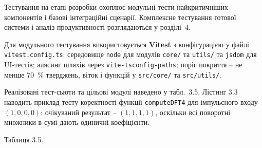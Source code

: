 \documentclass[
]{article}
\begin{document}
Тестування на етапі розробки охоплює модульні тести найкритичніших
компонентів і базові інтеграційні сценарії. Комплексне тестування
готової системи і аналіз продуктивності розглядаються у розділі~4.

Для модульного тестування використовується \textbf{Vitest} з
конфігурацією у файлі \texttt{vitest.config.ts}: середовище \texttt{node}
для модулів \texttt{core}\texttt{/} та \texttt{utils}\texttt{/} та
\texttt{jsdom} для UI-тестів; алясинг шляхів через
\texttt{vite-tsconfig-paths}; поріг покриття -- не менше 70~\% тверджень,
віток і функцій у \texttt{src}\texttt{/}\texttt{core}\texttt{/} та
\texttt{src}\texttt{/}\texttt{utils}\texttt{/}.

Реалізовані тест-сьюти та цільові модулі наведено у табл.~3.5. Лістинг
3.3 наводить приклад тесту коректності функції \texttt{computeDFT4} для
імпульсного входу \((1,0,0,0)\): очікуваний результат -- \((1,1,1,1)\),
оскільки всі поворотні множники в сумі дають одиничні коефіцієнти.

Таблиця 3.5.
\end{document}
